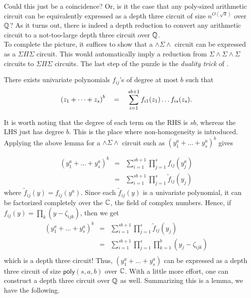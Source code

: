 \documentclass[12pt]{report}
\newcommand{\SESES}{\Sigma\!\wedge\!\Sigma\!\wedge\!\Sigma}
\newcommand{\poly}{\mathsf{poly}}
\begin{document}
Could this just be a coincidence? Or, is it the case that any poly-sized arithmetic circuit can be equivalently expressed as a depth three circuit of size $n^{O(\sqrt{d})}$ over $\mathbb{Q}$? As it turns out, there is indeed a depth reduction to convert any arithmetic circuit to a not-too-large depth three circuit over $\mathbb{Q}$. \\

To complete the picture, it suffices to show that a $\wedge\Sigma\wedge$ circuit can be expressed as a $\Sigma\Pi\Sigma$ circuit. This would automatically imply a reduction from $\SESES$ circuits to $\Sigma\Pi\Sigma$ circuits. The last step of the puzzle is the \emph{duality trick} of \cite{sax08}. 

\begin{lemma}\label{lem:duality} There exists univariate polynomials $f_{ij}$'s of degree at most $b$ such that
$$
\left(z_1 + \dots + z_s\right)^b \quad = \quad \sum_{i=1}^{sb+1} f_{i1}(z_1)\dots f_{is}(z_s).
$$
\end{lemma}

It is worth noting that the degree of each term on the RHS is $sb$, whereas the LHS just has degree $b$. This is the place where non-homogeneity is introduced. Applying the above lemma for a $\wedge\Sigma\wedge$ circuit such as $(y_1^a + \dots + y_s^a)^b$ gives

\begin{eqnarray*}
(y_1^a + \dots + y_s^a)^b & = & \sum_{i=1}^{sb+1} \prod_{j=1}^s f_{ij}(y_j^a)\\
 & = & \sum_{i=1}^{sb+1} \prod_{j=1}^s \tilde{f}_{ij}(y_j)
\end{eqnarray*}
where $\tilde{f}_{ij}(y) = f_{ij}(y^a)$. Since each $\tilde{f}_{ij}(y)$ is a univariate polynomial, it can be factorized completely over the $\mathbb{C}$, the field of complex numbers. Hence, if $f_{ij}(y) = \prod_k (y - \zeta_{ijk})$, then we get
\begin{eqnarray*}
(y_1^a + \dots + y_s^a)^b & = & \sum_{i=1}^{sb+1} \prod_{j=1}^s \tilde{f}_{ij}(y_j)\\
&= & \sum_{i=1}^{sb+1} \prod_{j=1}^s \prod_{k=1}^b (y_j - \zeta_{ijk})\\
\end{eqnarray*}
which is a depth three circuit! Thus, $(y_1^a + \dots + y_s^a)$ can be expressed as a depth three circuit of size $\poly(s,a,b)$ over $\mathbb{C}$. With a little more effort, one can construct a depth three circuit over $\mathbb{Q}$ as well. Summarizing this is a lemma, we have the following. 
\end{document}
